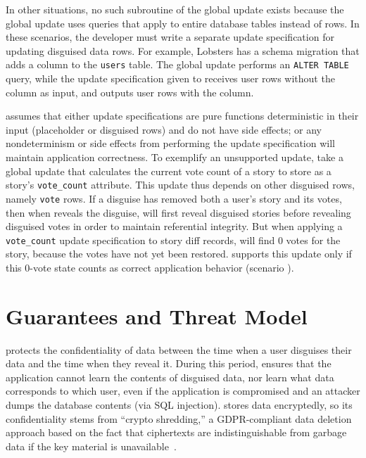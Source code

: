 %
In other situations, no such subroutine of the global update exists because the
global update uses queries that apply to entire database tables instead of rows.
In these scenarios, the developer must write a separate update specification for
updating disguised data rows.
%
For example, Lobsters has a schema migration that adds a column to the
\texttt{users} table.  The global update performs an \texttt{ALTER TABLE}
query, while the update specification given to \sys receives user rows without the column
as input, and outputs user rows with the column.
%

%
\sys assumes that either \one{} update specifications are pure functions deterministic in
their input (placeholder or disguised rows) and do not have side effects; or
\two{} any nondeterminism or side effects from performing the update specification will
maintain application correctness.
%
To exemplify an unsupported update, take a global update that calculates the
current vote count of a story to store as a story's \texttt{vote\_count}
attribute. 
%
This update thus depends on other disguised rows, namely \texttt{vote} rows.
%
If a disguise has removed both a user's story and its votes,
then when \sys reveals the disguise, \sys will first reveal disguised 
stories before revealing disguised votes in order to maintain referential
integrity. 
%
But when applying a \texttt{vote\_count} update specification to story diff
records, \sys will find 0 votes for the story, because the votes have not yet
been restored.
%
\sys supports this update only if this 0-vote state counts as correct application behavior (scenario
\two{}).
%


\section{Guarantees and Threat Model}
\label{s:threat}
%
%
%
\sys protects the confidentiality of \xxed data between the time when a user
disguises their data and the time when they reveal it.
%
%
During this period, \sys ensures that the application cannot learn the contents of
disguised data, nor learn what \xxed data corresponds to which user, even if the
application is compromised and an attacker dumps the database contents (\eg via
SQL injection).
%
\sys stores \xxed data encryptedly, so its confidentiality stems from ``crypto
shredding,'' a GDPR-compliant data deletion approach based on the fact that
ciphertexts are indistinguishable from garbage data if the key material is
unavailable~\cite{dnefs,townsend:cryptoshredding,aws:cryptoshredding,gtr:cryptoshredding}.
%

